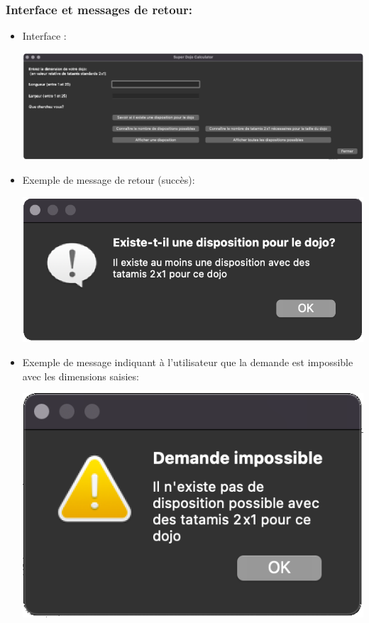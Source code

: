 \subsubsection*{Interface et messages de retour:}


\begin{itemize}
     

    \item Interface :

\begin{center}
    \includegraphics[scale=0.25]{images/betaInterface.png}
\end{center}


\item Exemple de message de retour (succès):

\begin{center}
    \includegraphics[scale=0.25]{images/betaRetourSucces.png}
\end{center}


\item Exemple de message indiquant à l’utilisateur que la demande est impossible avec les dimensions saisies:

\begin{center}
    \includegraphics[scale=0.25]{images/betaImpossible.png}
\end{center}



\end{itemize}
